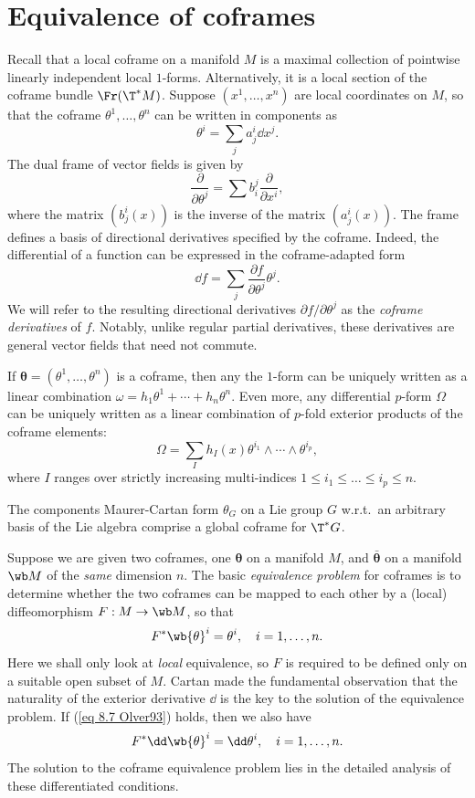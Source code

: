 \section{Equivalence of coframes}

Recall that a local coframe on a manifold $M$ is a maximal collection of pointwise linearly independent local $1$-forms. Alternatively, it is a local section of the coframe bundle $\Fr(\T^\ast M)$. Suppose $(x^1,\ldots,x^n)$ are local coordinates on $M$, so that the coframe $\theta^1,\ldots,\theta^n$ can be written in components as 
\[\theta^i=\sum_j a^i_j\dd x^j.\]
The dual frame of vector fields is given by 
\[\frac{\partial}{\partial\theta^j}=\sum b^j_i \frac{\partial}{\partial x^i},\]
where the matrix $(b^i_j(x))$ is the inverse of the matrix $(a^i_j(x))$. The frame defines a basis of directional derivatives specified by the coframe. Indeed, the differential of a function can be expressed in the coframe-adapted form 
\[\dd f=\sum_j \frac{\partial f}{\partial\theta^j}\theta^j.\label{eq 8.2 Olver93}\]
We will refer to the resulting directional derivatives $\partial f/\partial\theta^j$ as the \emph{coframe derivatives} of $f$. Notably, unlike regular partial derivatives, these derivatives are general vector fields that need not commute.

If $\bm\theta=(\theta^1,\ldots,\theta^n)$ is a coframe, then any the $1$-form can be uniquely written as a linear combination $\omega=h_1\theta^1+\cdots+h_n\theta^n$. Even more, any differential $p$-form $\Omega$ can be uniquely written as a linear combination of $p$-fold exterior products of the coframe elements:
\[\Omega=\sum_I h_I(x)\theta^{i_1}\wedge\cdots\wedge\theta^{i_p},\]
where $I$ ranges over strictly increasing multi-indices $1\leq i_1\leq \ldots\leq i_p\leq n$.

\begin{example}
    The components Maurer-Cartan form $\theta_G$ on a Lie group $G$ w.r.t.\ an arbitrary basis of the Lie algebra comprise a global coframe for $\T^\ast G$.
\end{example}

Suppose we are given two coframes, one $\bm\theta$ on a manifold $M$, and $\bar{\bm\theta}$ on a manifold $\wb M$ of the \emph{same} dimension $n$. The basic \emph{equivalence problem} for coframes is to determine whether the two coframes can be mapped to each other by a (local) diffeomorphism $F:M\to \wb M$, so that 
\[F^\ast\wb{\theta}^i=\theta^i,\quad i=1,\ldots,n.\label{eq 8.7 Olver93}\]
Here we shall only look at \emph{local} equivalence, so $F$ is required to be defined only on a suitable open subset of $M$. Cartan made the fundamental observation that the naturality of the exterior derivative $\dd$ is the key to the solution of the equivalence problem. If (\ref{eq 8.7 Olver93}) holds, then we also have 
\[F^\ast\dd\wb{\theta}^i=\dd\theta^i,\quad i=1,\ldots,n.\]
The solution to the coframe equivalence problem lies in the detailed analysis of these differentiated conditions.

